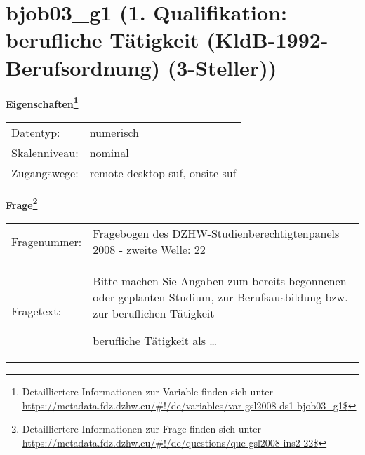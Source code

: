 
    \setcounter{footnote}{0}

    \vspace*{-1.8cm}
	\section{bjob03\_g1 (1. Qualifikation: berufliche Tätigkeit (KldB-1992-Berufsordnung) (3-Steller))}
	\label{section:bjob03_g1}



    \vspace*{0.5cm}
    \noindent\textbf{Eigenschaften\footnote{Detailliertere Informationen zur Variable finden sich unter
		\url{https://metadata.fdz.dzhw.eu/\#!/de/variables/var-gsl2008-ds1-bjob03_g1$}}}\\
	\begin{tabularx}{\hsize}{@{}lX}
	Datentyp: & numerisch \\
	Skalenniveau: & nominal \\
	Zugangswege: &
	  remote-desktop-suf, 
	  onsite-suf
 \\
    \end{tabularx}



				\vspace*{0.5cm}
                \noindent\textbf{Frage\footnote{Detailliertere Informationen zur Frage finden sich unter
		              \url{https://metadata.fdz.dzhw.eu/\#!/de/questions/que-gsl2008-ins2-22$}}}\\
				\begin{tabularx}{\hsize}{@{}lX}
					Fragenummer: &
					  Fragebogen des DZHW-Studienberechtigtenpanels 2008 - zweite Welle:
					  22
 \\
					Fragetext: & Bitte machen Sie Angaben zum bereits begonnenen oder geplanten Studium, zur Berufsausbildung bzw. zur beruflichen Tätigkeit\par  berufliche Tätigkeit als … \\
				\end{tabularx}





